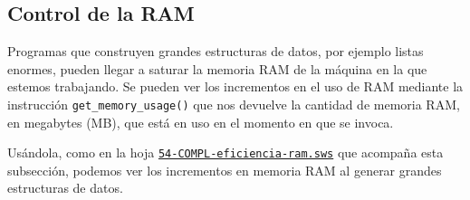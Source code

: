 \subsection{Control de la RAM}

Programas que construyen grandes estructuras de datos, por ejemplo listas
enormes, pueden llegar a saturar la memoria RAM de la m\'aquina en la que
estemos trabajando. Se pueden ver los incrementos en el uso de RAM mediante la
instrucci\'on 
\lstinline|get_memory_usage()| que nos devuelve la cantidad de memoria RAM, en
megabytes (MB), que est\'a en uso en el momento en que se invoca. 

Us\'andola, como en la hoja 
\href{http://sage.mat.uam.es:8888/home/pub/11/}{\tt 54-COMPL-eficiencia-ram.sws}
que acompa\~na
esta subsecci\'on,  podemos ver los
incrementos en memoria RAM al generar grandes estructuras de datos.


